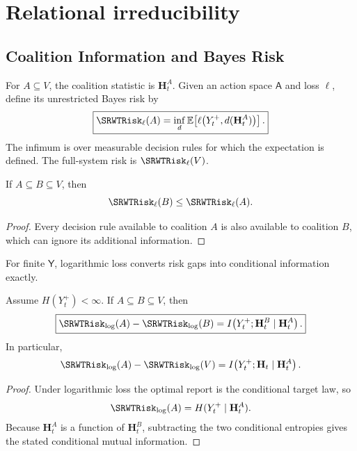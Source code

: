 
\chapter{Relational irreducibility}\label{SRWT:book:chapter-73}


\section{Coalition Information and Bayes Risk}

For \(A\subseteq V\), the coalition statistic is \(\mathbf H_t^A\). Given an
action space \(\mathsf A\) and loss \(\ell\), define its unrestricted Bayes
risk by
\[
\boxed{
\SRWTRisk_\ell(A)
=
\inf_d
\mathbb E\!\left[
\ell\bigl(Y_t^+,d(\mathbf H_t^A)\bigr)
\right].
}
\]
The infimum is over measurable decision rules for which the expectation is
defined. The full-system risk is \(\SRWTRisk_\ell(V)\).

\begin{SRWTproposition}\label{SRWT:prop:coalition-monotonicity}
If \(A\subseteq B\subseteq V\), then
\[
\SRWTRisk_\ell(B)\leq\SRWTRisk_\ell(A).
\]
\end{SRWTproposition}

\begin{proof}
Every decision rule available to coalition \(A\) is also available to coalition
\(B\), which can ignore its additional information.
\end{proof}

For finite \(\mathsf Y\), logarithmic loss converts risk gaps into conditional
information exactly.

\begin{SRWTtheorem}\label{SRWT:thm:coalition-log-risk}
Assume \(H(Y_t^+)<\infty\). If \(A\subseteq B\subseteq V\), then
\[
\boxed{
\SRWTRisk_{\log}(A)-\SRWTRisk_{\log}(B)
=
I\!\left(
Y_t^+;\mathbf H_t^B
\mid
\mathbf H_t^A
\right).
}
\]
In particular,
\[
\SRWTRisk_{\log}(A)-\SRWTRisk_{\log}(V)
=
I\!\left(
Y_t^+;\mathbf H_t
\mid
\mathbf H_t^A
\right).
\]
\end{SRWTtheorem}

\begin{proof}
Under logarithmic loss the optimal report is the conditional target law, so
\[
\SRWTRisk_{\log}(A)=H(Y_t^+\mid\mathbf H_t^A).
\]
Because \(\mathbf H_t^A\) is a function of \(\mathbf H_t^B\), subtracting the
two conditional entropies gives the stated conditional mutual information.
\end{proof}

